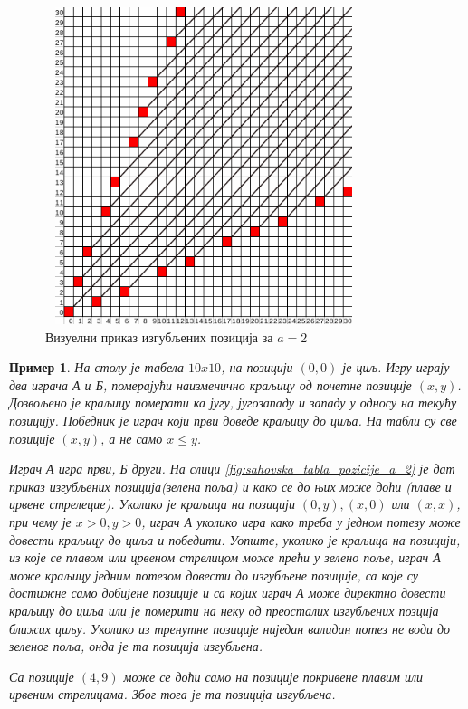 \documentclass[a4paper]{article}
\newtheorem{example}{Пример}
\begin{document}
\begin{figure}[H]
	\caption{Визуелни приказ изгубљених позиција за $ a = 2 $}
	\label{fig:p_positions_a=1}
	\begin{center}
		\includegraphics[width=350px, height=350px]{p_positions_a=2.png}
	\end{center}
\end{figure}

\begin{example}
	На столу је табела $ 10x10 $, на позицији $ (0, 0) $ је циљ. Игру играју два играча \textit{А} и \textit{Б}, померајући наизменично краљицу од почетне позиције $ (x,y) $. Дозвољено је краљицу померати ка југу, југозападу и западу у односу на текућу позицију.  Победник је играч који први доведе краљицу до циља. На табли су све позиције $ (x, y) $, а не само $ x \leq y $.
	
	Играч \textit{А} игра први, \textit{Б} други. На слици \ref{fig:sahovska_tabla_pozicije_a_2} је дат приказ изгубљених позиција(зелена поља) и како се до њих може доћи (плаве и црвене стрелецие). Уколико је краљица на позицији $ (0, y), (x,0) $ или $ (x,x) $, при чему је $ x > 0, y > 0 $, играч \textit{А} уколико игра како треба у једном потезу може довести краљицу до циља и победити. Уопште, уколико је краљица на позицији, из које се плавом или црвеном стрелицом може прећи у зелено поље, играч \textit{А} може краљицу једним потезом довести до изгубљене позиције, са које су достижне само добијене позиције и са којих играч \textit{А} може директно довести краљицу до циља или је померити на неку од преосталих изгубљених позција ближих циљу. Уколико из тренутне позиције ниједан валидан потез не води до зеленог поља, онда је та позиција изгубљена. 
	
	Са позиције $ (4, 9) $ може се доћи само на позиције покривене плавим или црвеним стрелицама. Због тога је та позиција изгубљена.
\end{example}
 
\end{document}

